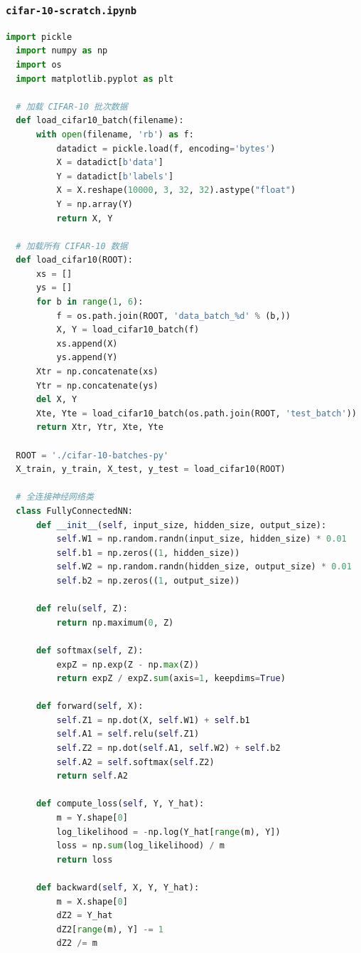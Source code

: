 \documentclass[12pt]{article}
\begin{document}
\subsubsection{\texttt{cifar-10-scratch.ipynb}}
\begin{lstlisting}[language=Python]
  import pickle
  import numpy as np
  import os
  import matplotlib.pyplot as plt
  
  # 加载 CIFAR-10 批次数据
  def load_cifar10_batch(filename):
      with open(filename, 'rb') as f:
          datadict = pickle.load(f, encoding='bytes')
          X = datadict[b'data']
          Y = datadict[b'labels']
          X = X.reshape(10000, 3, 32, 32).astype("float")
          Y = np.array(Y)
          return X, Y
  
  # 加载所有 CIFAR-10 数据
  def load_cifar10(ROOT):
      xs = []
      ys = []
      for b in range(1, 6):
          f = os.path.join(ROOT, 'data_batch_%d' % (b,))
          X, Y = load_cifar10_batch(f)
          xs.append(X)
          ys.append(Y)
      Xtr = np.concatenate(xs)
      Ytr = np.concatenate(ys)
      del X, Y
      Xte, Yte = load_cifar10_batch(os.path.join(ROOT, 'test_batch'))
      return Xtr, Ytr, Xte, Yte
  
  ROOT = './cifar-10-batches-py'
  X_train, y_train, X_test, y_test = load_cifar10(ROOT)
  
  # 全连接神经网络类
  class FullyConnectedNN:
      def __init__(self, input_size, hidden_size, output_size):
          self.W1 = np.random.randn(input_size, hidden_size) * 0.01
          self.b1 = np.zeros((1, hidden_size))
          self.W2 = np.random.randn(hidden_size, output_size) * 0.01
          self.b2 = np.zeros((1, output_size))
  
      def relu(self, Z):
          return np.maximum(0, Z)
  
      def softmax(self, Z):
          expZ = np.exp(Z - np.max(Z))
          return expZ / expZ.sum(axis=1, keepdims=True)
  
      def forward(self, X):
          self.Z1 = np.dot(X, self.W1) + self.b1
          self.A1 = self.relu(self.Z1)
          self.Z2 = np.dot(self.A1, self.W2) + self.b2
          self.A2 = self.softmax(self.Z2)
          return self.A2
  
      def compute_loss(self, Y, Y_hat):
          m = Y.shape[0]
          log_likelihood = -np.log(Y_hat[range(m), Y])
          loss = np.sum(log_likelihood) / m
          return loss
  
      def backward(self, X, Y, Y_hat):
          m = X.shape[0]
          dZ2 = Y_hat
          dZ2[range(m), Y] -= 1
          dZ2 /= m
  

\end{lstlisting}
\end{document}
